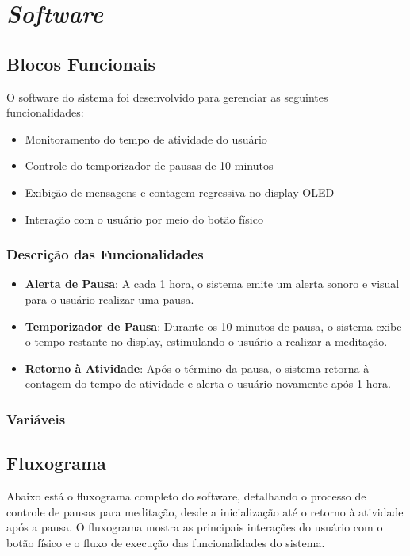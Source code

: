 \documentclass{article}
\begin{document}
\section{\textit{Software}}

\subsection{Blocos Funcionais}
O software do sistema foi desenvolvido para gerenciar as seguintes funcionalidades:
\begin{itemize}
    \item Monitoramento do tempo de atividade do usuário
    \item Controle do temporizador de pausas de 10 minutos
    \item Exibição de mensagens e contagem regressiva no display OLED
    \item Interação com o usuário por meio do botão físico
\end{itemize}
\subsubsection{Descrição das Funcionalidades}
\begin{itemize}
  \item \textbf{Alerta de Pausa}: A cada 1 hora, o sistema emite um alerta sonoro e visual para o usuário realizar uma pausa.
  \item \textbf{Temporizador de Pausa}: Durante os 10 minutos de pausa, o sistema exibe o tempo restante no display, estimulando o usuário a realizar a meditação.
  \item \textbf{Retorno à Atividade}: Após o término da pausa, o sistema retorna à contagem do tempo de atividade e alerta o usuário novamente após 1 hora.
\end{itemize}

\subsubsection{Variáveis}
\subsection{Fluxograma}
Abaixo está o fluxograma completo do software, detalhando o processo de controle de pausas para meditação, desde a inicialização até o retorno à atividade após a pausa. O fluxograma mostra as principais interações do usuário com o botão físico e o fluxo de execução das funcionalidades do sistema.
\end{document}
